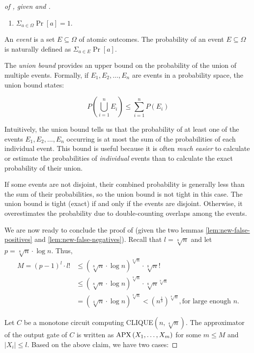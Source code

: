 \begin{proof}[of , given   and ]
\begin{tcolorbox}[colframe=white, colback=green!4, boxrule=0mm, sharp corners]
\begin{enumerate}
\item $\Sigma_{a\in\Omega}\Pr[a]=1$.
\end{enumerate} 

An \emph{event} is a set $E\subseteq\Omega$ of atomic outcomes. The probability of an event $E\subseteq\Omega$ is naturally defined as $\Sigma_{a\in E}\Pr[a]$. 


\bigskip 
The \emph{union bound} provides an upper bound on the probability of the union of multiple events. Formally, if \( E_1, E_2, \dots, E_n \) are events in a probability space, the union bound states:

\[
P\left(\bigcup_{i=1}^n E_i\right) \leq \sum_{i=1}^n P(E_i)
\]

Intuitively, the union bound tells us that the probability of at least one of the events \( E_1, E_2, \dots, E_n \) occurring is at most the sum of the probabilities of each individual event. This bound is useful because it is often \emph{much easier} to calculate or estimate the probabilities of \emph{individual} events than to calculate the exact probability of their union.

 If some events are not disjoint, their combined probability is generally less than the sum of their probabilities, so the union bound is not tight in this case. The union bound is tight (exact) if and only if the events are disjoint. Otherwise, it overestimates the probability due to double-counting overlaps among the events.




\end{tcolorbox}

We are now ready to conclude the proof of  (given the two lemmas \ref{lem:new-false-positives} and \ref{lem:new-false-negatives}).
Recall that $l=\sqrt[8]{n}$ and
let $p=\sqrt[8]{n} \cdot \log n$. 
Thus, 
\begin{equation}
\label{eq:651:16}
\begin{aligned}
M  = 
(p-1)^l \cdot l!
& \leq (\sqrt[8]{n} \cdot \log n)^{\sqrt[8]{n}} \cdot \sqrt[8]{n}! \\
& \leq (\sqrt[8]{n} \cdot \log n)^{\sqrt[8]{n}}
\cdot \sqrt[8]{n}^{\sqrt[8]{n}} \\
& =(\sqrt[4]{n} \cdot \log n)^{\sqrt[8]{n}}<
\left(n^{\frac{1}{3}}\right)^{\sqrt[8]{n}}, \text{
for large enough $n$.}
\end{aligned}
\end{equation}


Let $C$ be a monotone circuit computing CLIQUE$(n, \sqrt[4]{n})$.
%
%
%
The approximator of the output gate of $C$ is written as  $\operatorname{\mathrm{APX}}\left(X_1, \ldots, X_m\right)$ for some $m \leq M$ and $\left|X_i\right| \leq l$.
Based on the above claim, we have two cases:
\medskip 


\end{proof}
